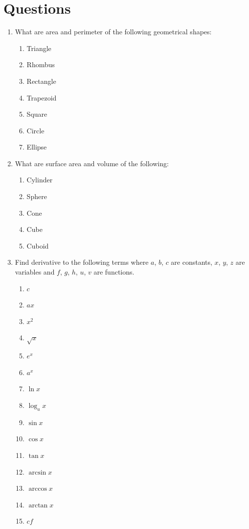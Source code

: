 \documentclass{article}
\begin{document}
{		\section*{Questions}
		\begin{multicols}{4}
		\begin{enumerate}
		\item What are area and perimeter of the following geometrical shapes:
		\begin{enumerate}
		    \item Triangle
		    \item Rhombus
		    \item Rectangle
		    \item Trapezoid
		    \item Square
		    \item Circle
		    \item Ellipse
		\end{enumerate}
		\item What are surface area and volume of the following:
		\begin{enumerate}
		    \item Cylinder
		    \item Sphere
		    \item Cone
		    \item Cube
		    \item Cuboid
		\end{enumerate}
		\item Find derivative to the following terms where $a$, $b$, $c$ are constants, $x$, $y$, $z$ are variables and $f$, $g$, $h$, $u$, $v$ are functions.
		\begin{enumerate}
		    \item $c$
		    \item $ax$
		    \item $x^2$
		    \item $\sqrt x$
		    \item $e^x$
		    \item $a^x$
		    \item $\ln {x}$
		    \item $\log_a{x}$
		    \item $\sin{x}$
		    \item $\cos{x}$
		    \item $\tan{x}$
		    \item $\arcsin{x}$
		    \item $\arccos{x}$
		    \item $\arctan {x}$
		    \item $cf$

\end{enumerate}
\end{enumerate}
\end{multicols}}
\end{document}

